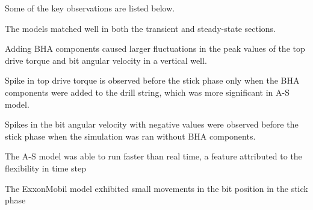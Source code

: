 Some of the key observations are listed below.
\begin{bulletedlist}
    \item The models matched well in both the transient and steady-state sections.
    \item Adding BHA components caused larger fluctuations in the peak values of the top drive torque and bit angular velocity in a vertical well.
    \item Spike in top drive torque is observed before the stick phase only when the BHA components were added to the drill string, which was more significant in A-S model. 
    \item Spikes in the bit angular velocity with negative values were observed before the stick phase when the simulation was ran without BHA components. 
    \item The A-S model was able to run faster than real time, a feature attributed to the flexibility in time step
    \item The ExxonMobil model exhibited small movements in the bit position in the stick phase
\end{bulletedlist} 